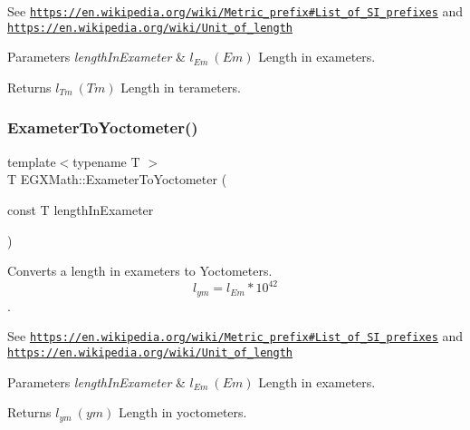 See \href{https://en.wikipedia.org/wiki/Metric_prefix#List_of_SI_prefixes}{\tt https\+://en.\+wikipedia.\+org/wiki/\+Metric\+\_\+prefix\#\+List\+\_\+of\+\_\+\+S\+I\+\_\+prefixes} and \href{https://en.wikipedia.org/wiki/Unit_of_length}{\tt https\+://en.\+wikipedia.\+org/wiki/\+Unit\+\_\+of\+\_\+length} 
\begin{DoxyParams}{Parameters}
{\em length\+In\+Exameter} & $ l_{Em}\ (Em)$ Length in exameters. \\
\hline
\end{DoxyParams}
\begin{DoxyReturn}{Returns}
$ l_{Tm}\ (Tm)$ Length in terameters. 
\end{DoxyReturn}
\mbox{\label{group___e_g_x_math-_conversions-_length_conversions-_exameter-_s_i_ga0da838a3aa4a2f6ee53687aa346f80ef}} 
\subsubsection{\texorpdfstring{Exameter\+To\+Yoctometer()}{ExameterToYoctometer()}}
{\footnotesize\ttfamily template$<$typename T $>$ \\
T E\+G\+X\+Math\+::\+Exameter\+To\+Yoctometer (\begin{DoxyParamCaption}\item[{const T}]{length\+In\+Exameter }\end{DoxyParamCaption})}



Converts a length in exameters to Yoctometers. \[ l_{ym}=l_{Em} * 10^{42} \]. 

See \href{https://en.wikipedia.org/wiki/Metric_prefix#List_of_SI_prefixes}{\tt https\+://en.\+wikipedia.\+org/wiki/\+Metric\+\_\+prefix\#\+List\+\_\+of\+\_\+\+S\+I\+\_\+prefixes} and \href{https://en.wikipedia.org/wiki/Unit_of_length}{\tt https\+://en.\+wikipedia.\+org/wiki/\+Unit\+\_\+of\+\_\+length} 
\begin{DoxyParams}{Parameters}
{\em length\+In\+Exameter} & $ l_{Em}\ (Em)$ Length in exameters. \\
\hline
\end{DoxyParams}
\begin{DoxyReturn}{Returns}
$ l_{ym}\ (ym)$ Length in yoctometers. 
\end{DoxyReturn}
\mbox{\label{group___e_g_x_math-_conversions-_length_conversions-_exameter-_s_i_ga052b009f7705d8ad81083116d15dec65}} 
